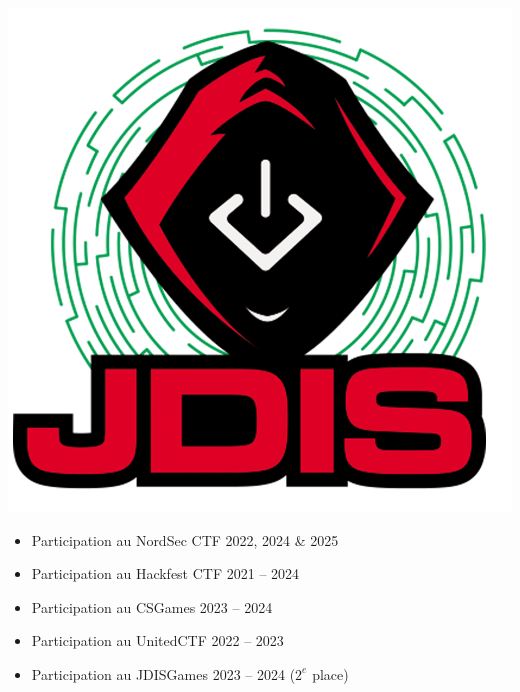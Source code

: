 \documentclass[10pt,a4paper,withhyper]{altacv}
\begin{document}
\hfill\begin{minipage}{1.25cm}
    \includegraphics[width=\linewidth]{figures/jdis}
\end{minipage}
\vspace{-1.25cm}

\begin{itemize}
\item Participation au NordSec CTF 2022, 2024 \& 2025
\item Participation au Hackfest CTF 2021 -- 2024
\item Participation au CSGames 2023 -- 2024
\item Participation au UnitedCTF 2022 -- 2023
\item Participation au JDISGames 2023 -- 2024 ($2^e$ place)
\end{itemize}

\divider
\end{document}
